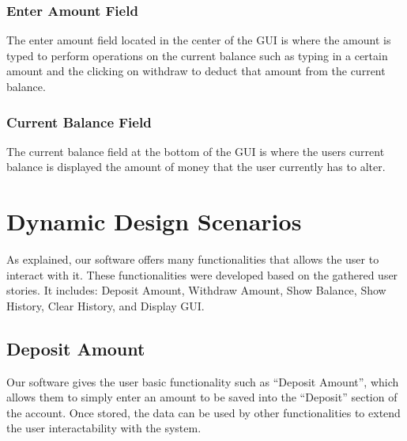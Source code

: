\documentclass[12pt]{article}
\begin{document}

\subsubsection{Enter Amount Field}
The enter amount field located in the center of the GUI is where the amount is typed to perform operations on the current balance such as typing in a certain amount and the clicking on withdraw to deduct that amount from the current balance.


\subsubsection{Current Balance Field}
The current balance field at the bottom of the GUI is where the users current balance is displayed the amount of money that the user currently has to alter.



\section{Dynamic Design Scenarios}
As explained, our software offers many functionalities that allows the user to interact with it. These functionalities were developed based on the gathered user stories. It includes: Deposit Amount, Withdraw Amount, Show Balance, Show History, Clear History, and Display GUI. 

\subsection{Deposit Amount}
Our software gives the user basic functionality such as “Deposit Amount”, which allows them to simply enter an amount to be saved into the “Deposit” section of the account. Once stored, the data can be used by other functionalities to extend the user interactability with the system. 
\end{document}
